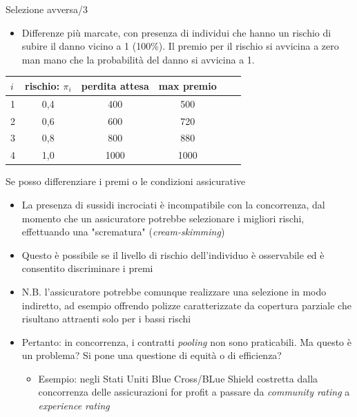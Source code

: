 \documentclass[aspectratio=149,11pt]{beamer}
\begin{document}
\begin{frame}{Selezione avversa/3}
\begin{itemize}
\item Differenze più marcate, con presenza di individui che hanno un rischio di subire il danno vicino a 1 (100\%). Il premio per il rischio si avvicina a zero man mano che la probabilità del danno si avvicina a 1.
\end{itemize}

\begin{center}
\begin{tabular}{lccccl}
  \toprule
  $i$&rischio: $\pi_i$&perdita attesa & max premio\\
  \midrule
  1 & 0,4 &400 & 500 \\
  2 & 0,6 &600 & 720 \\
  3 & 0,8 &800 & 880 \\
  4 & 1,0 &1000&1000 \\
  \bottomrule
\end{tabular}
\end{center}
\end{frame}

\begin{frame}{Se posso differenziare i premi o le condizioni assicurative}
\begin{itemize}
\item La presenza di sussidi incrociati è incompatibile con la concorrenza, dal
momento che un assicuratore potrebbe selezionare i migliori rischi,
effettuando una "scrematura" (\emph{cream-skimming})
\item Questo è possibile se il livello di rischio dell'individuo è osservabile ed
è consentito discriminare i premi
\item N.B. l'assicuratore potrebbe comunque realizzare una selezione in modo
indiretto, ad esempio offrendo polizze caratterizzate da copertura parziale
che risultano attraenti solo per i bassi rischi
\item Pertanto: in concorrenza, i contratti \emph{pooling} non sono praticabili. Ma
questo è un problema? Si pone una questione di equità o di efficienza?
\begin{itemize}
\item Esempio: negli Stati Uniti Blue Cross/BLue Shield costretta dalla
concorrenza delle assicurazioni for profit a passare da \emph{community rating}
a \emph{experience rating}
\end{itemize}
\end{itemize}
\end{frame}
\end{document}
